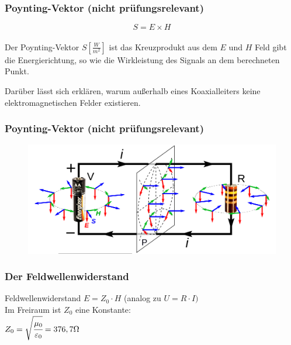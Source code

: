 \begin{frame}
  \frametitle{Poynting-Vektor (nicht prüfungsrelevant)}
  \begin{center}
    \huge $$S = E \times H$$ \\[1em]
    \large Der Poynting-Vektor $S[\frac{W}{m^2}]$ ist das Kreuzprodukt aus dem $E$ und $H$ Feld gibt die Energierichtung, so wie die Wirkleistung des Signals an dem berechneten Punkt.

    Darüber lässt sich erklären, warum außerhalb eines Koaxialleiters keine elektromagnetischen Felder existieren.
  \end{center}
\end{frame}

\begin{frame}
  \frametitle{Poynting-Vektor (nicht prüfungsrelevant)}
  \begin{center}
    \begin{figure}
      \includegraphics[width=1\textwidth,height=.75\textheight,keepaspectratio]{a08/Poynting_vectors_of_DC_circuit.png}
    \end{figure}
  \end{center}
\end{frame}

\begin{frame}
  \frametitle{Der Feldwellenwiderstand}
  \begin{block}{Feldwellenwiderstand}
    $E = Z_0 \cdot H$ \hspace{2cm} (analog zu $U = R \cdot I)$ \\[1em]
    Im Freiraum ist $Z_0$ eine Konstante: \\[1em]
    $Z_0 = \sqrt{\cfrac{\mu_0}{\varepsilon_0}} = 376,7 \Omega$ \\[1em]
  \end{block}
\end{frame}

